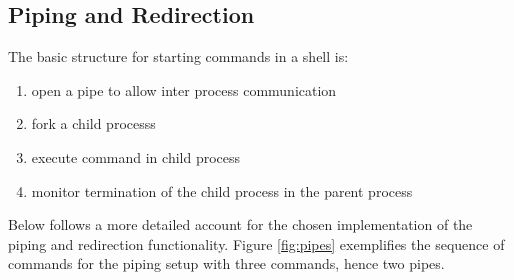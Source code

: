\documentclass[a4paper,11pt,twoside]{article}
\begin{document}
\subsection{Piping and Redirection}

The basic structure for starting commands in a shell is:
\begin{enumerate}
\item open a pipe to allow inter process communication
\item fork a child processs
\item execute command in child process
\item monitor termination of the child process in the parent process
\end{enumerate}

Below follows a more detailed account for the chosen implementation of the piping and redirection functionality. Figure \ref{fig:pipes} exemplifies the sequence of commands for the piping setup with three commands, hence two pipes. 
\end{document}
